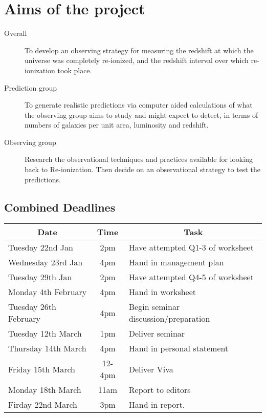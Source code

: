 \section{Aims of the project}
\begin{description}
	\item[Overall] To develop an observing strategy for measuring the redshift at which the universe was completely re-ionized, and the redshift interval over which re-ionization took place.

	\item[Prediction group] To generate realistic predictions via computer aided calculations of what the observing group aims to study and might expect to detect, in terms of numbers of galaxies per unit area, luminosity and redshift.

	\item[Observing group] Research the observational techniques and practices available for looking back to Re-ionization. Then decide on an observational strategy to test the predictions.
\end{description}

\subsection{Combined Deadlines} %
\label{sub:combined_deadlines}
\begin{table}[ht]
	\centering
	\begin{tabular}{l|c|l}
		\multicolumn{1}{c}{\textbf{Date}} & \textbf{Time} & \multicolumn{1}{c}{\textbf{Task}} \\
		\hline \hline
		Tuesday 22nd Jan 		& 2pm & Have attempted Q1-3 of worksheet \\
		Wednesday 23rd Jan 		& 4pm & Hand in management plan \\
		Tuesday 29th Jan 		& 2pm & Have attempted Q4-5 of worksheet \\
		Monday 4th February 	& 4pm & Hand in worksheet \\
		Tuesday 26th February 	& 4pm & Begin seminar discussion/preparation \\
		Tuesday 12th March 		& 1pm & Deliver seminar \\
		Thursday 14th March 	& 4pm & Hand in personal statement \\
		Friday 15th March 		& 12-4pm	& Deliver Viva \\
		Monday 18th March		& 11am	& Report to editors \\
		Firday 22nd March 		& 3pm & Hand in report.
	\end{tabular}
\end{table} 
